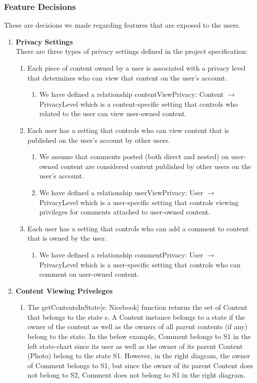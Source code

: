 \documentclass[titlepage]{article}
\begin{document}
\subsubsection{Feature Decisions}
These are decisions we made regarding features that are exposed to the users.
\begin{enumerate}
\item\textbf{Privacy Settings}\\
There are three types of privacy settings defined in the project specification:
\begin{enumerate}
	\item Each piece of content owned by a user is associated with a privacy level that determines who can view that content on the user’s account.
	      \begin{enumerate}
		      \item We have defined a relationship contentViewPrivacy: Content $\rightarrow$ PrivacyLevel which is a content-specific setting that controls who related to the user can view user-owned content.
	      \end{enumerate}
	\item Each user has a setting that controls who can view content that is published on the user’s account by other users.
	      \begin{enumerate}
		      \item We assume that comments posted (both direct and nested) on user-owned content are considered content published by other users on the user’s account.
		      \item We have defined a relationship userViewPrivacy: User $\rightarrow$ PrivacyLevel which is a user-specific setting that controls viewing privileges for comments attached to user-owned content.
	      \end{enumerate}
	\item Each user has a setting that controls who can add a comment to content that is owned by the user.
	      \begin{enumerate}
		      \item We have defined a relationship commentPrivacy: User $\rightarrow$ PrivacyLevel which is a user-specific setting that controls who can comment on user-owned content.
	      \end{enumerate}
\end{enumerate}
\item\textbf{Content Viewing Priveleges}
\begin{enumerate}
	\item The getContentsInState[s: Nicebook] function returns the set of Content that belongs to the state s. A Content instance belongs to a state if the owner of the content as well as the owners of all parent contents (if any) belong to the state. In the below example, Comment belongs to S1 in the left state-chart since its user as well as the owner of its parent Content (Photo) belong to the state S1. However, in the right diagram, the owner of Comment belongs to S1, but since the owner of its parent Content does not belong to S2, Comment does not belong to S1 in the right diagram.


\end{enumerate}
\end{enumerate}
\end{document}
